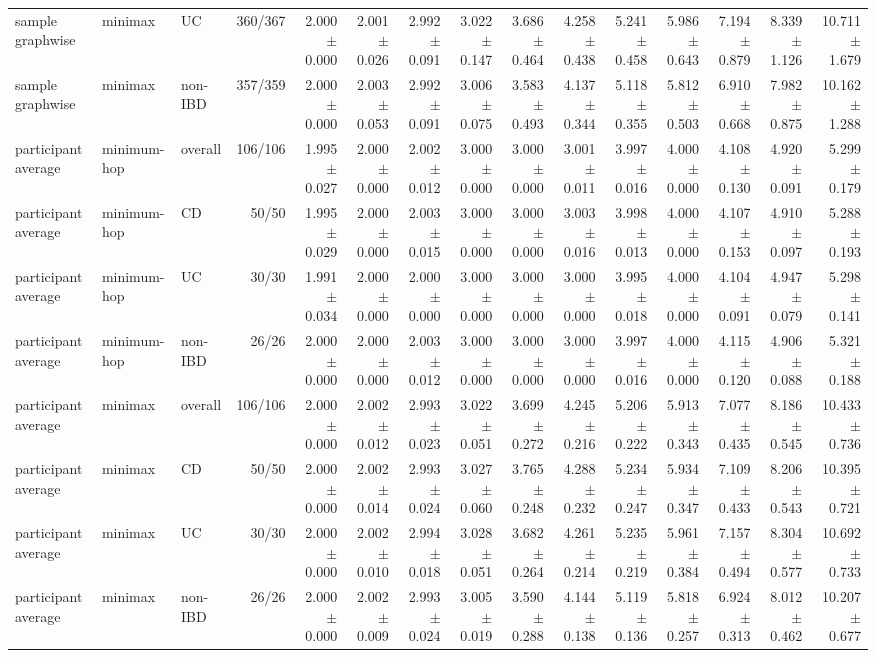 \begin{table}[ht]
{\begin{tabular}{lllrrrrrrrrrrrr}
sample graphwise & minimax & UC & 360/367 & 2.000 $\pm$ 0.000 & 2.001 $\pm$ 0.026 & 2.992 $\pm$ 0.091 & 3.022 $\pm$ 0.147 & 3.686 $\pm$ 0.464 & 4.258 $\pm$ 0.438 & 5.241 $\pm$ 0.458 & 5.986 $\pm$ 0.643 & 7.194 $\pm$ 0.879 & 8.339 $\pm$ 1.126 & 10.711 $\pm$ 1.679 \\
sample graphwise & minimax & non-IBD & 357/359 & 2.000 $\pm$ 0.000 & 2.003 $\pm$ 0.053 & 2.992 $\pm$ 0.091 & 3.006 $\pm$ 0.075 & 3.583 $\pm$ 0.493 & 4.137 $\pm$ 0.344 & 5.118 $\pm$ 0.355 & 5.812 $\pm$ 0.503 & 6.910 $\pm$ 0.668 & 7.982 $\pm$ 0.875 & 10.162 $\pm$ 1.288 \\
participant average & minimum-hop & overall & 106/106 & 1.995 $\pm$ 0.027 & 2.000 $\pm$ 0.000 & 2.002 $\pm$ 0.012 & 3.000 $\pm$ 0.000 & 3.000 $\pm$ 0.000 & 3.001 $\pm$ 0.011 & 3.997 $\pm$ 0.016 & 4.000 $\pm$ 0.000 & 4.108 $\pm$ 0.130 & 4.920 $\pm$ 0.091 & 5.299 $\pm$ 0.179 \\
participant average & minimum-hop & CD & 50/50 & 1.995 $\pm$ 0.029 & 2.000 $\pm$ 0.000 & 2.003 $\pm$ 0.015 & 3.000 $\pm$ 0.000 & 3.000 $\pm$ 0.000 & 3.003 $\pm$ 0.016 & 3.998 $\pm$ 0.013 & 4.000 $\pm$ 0.000 & 4.107 $\pm$ 0.153 & 4.910 $\pm$ 0.097 & 5.288 $\pm$ 0.193 \\
participant average & minimum-hop & UC & 30/30 & 1.991 $\pm$ 0.034 & 2.000 $\pm$ 0.000 & 2.000 $\pm$ 0.000 & 3.000 $\pm$ 0.000 & 3.000 $\pm$ 0.000 & 3.000 $\pm$ 0.000 & 3.995 $\pm$ 0.018 & 4.000 $\pm$ 0.000 & 4.104 $\pm$ 0.091 & 4.947 $\pm$ 0.079 & 5.298 $\pm$ 0.141 \\
participant average & minimum-hop & non-IBD & 26/26 & 2.000 $\pm$ 0.000 & 2.000 $\pm$ 0.000 & 2.003 $\pm$ 0.012 & 3.000 $\pm$ 0.000 & 3.000 $\pm$ 0.000 & 3.000 $\pm$ 0.000 & 3.997 $\pm$ 0.016 & 4.000 $\pm$ 0.000 & 4.115 $\pm$ 0.120 & 4.906 $\pm$ 0.088 & 5.321 $\pm$ 0.188 \\
participant average & minimax & overall & 106/106 & 2.000 $\pm$ 0.000 & 2.002 $\pm$ 0.012 & 2.993 $\pm$ 0.023 & 3.022 $\pm$ 0.051 & 3.699 $\pm$ 0.272 & 4.245 $\pm$ 0.216 & 5.206 $\pm$ 0.222 & 5.913 $\pm$ 0.343 & 7.077 $\pm$ 0.435 & 8.186 $\pm$ 0.545 & 10.433 $\pm$ 0.736 \\
participant average & minimax & CD & 50/50 & 2.000 $\pm$ 0.000 & 2.002 $\pm$ 0.014 & 2.993 $\pm$ 0.024 & 3.027 $\pm$ 0.060 & 3.765 $\pm$ 0.248 & 4.288 $\pm$ 0.232 & 5.234 $\pm$ 0.247 & 5.934 $\pm$ 0.347 & 7.109 $\pm$ 0.433 & 8.206 $\pm$ 0.543 & 10.395 $\pm$ 0.721 \\
participant average & minimax & UC & 30/30 & 2.000 $\pm$ 0.000 & 2.002 $\pm$ 0.010 & 2.994 $\pm$ 0.018 & 3.028 $\pm$ 0.051 & 3.682 $\pm$ 0.264 & 4.261 $\pm$ 0.214 & 5.235 $\pm$ 0.219 & 5.961 $\pm$ 0.384 & 7.157 $\pm$ 0.494 & 8.304 $\pm$ 0.577 & 10.692 $\pm$ 0.733 \\
participant average & minimax & non-IBD & 26/26 & 2.000 $\pm$ 0.000 & 2.002 $\pm$ 0.009 & 2.993 $\pm$ 0.024 & 3.005 $\pm$ 0.019 & 3.590 $\pm$ 0.288 & 4.144 $\pm$ 0.138 & 5.119 $\pm$ 0.136 & 5.818 $\pm$ 0.257 & 6.924 $\pm$ 0.313 & 8.012 $\pm$ 0.462 & 10.207 $\pm$ 0.677 \\
\bottomrule
\end{tabular}%
}
\end{table}
